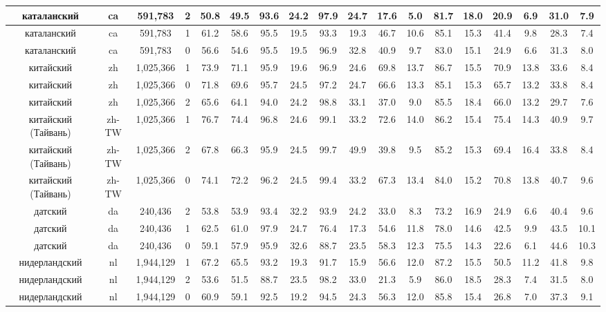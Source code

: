 \begin{table*}
{\begin{tabular}{|c|c|c|c||c|c|c|c|c|c|c|c|c|c|c|c|c|c|}
каталанский & ca & 591,783 & 2 & 50.8 & 49.5 & 93.6 & 24.2 & 97.9 & 24.7 & 17.6 & 5.0 & 81.7 & 18.0 & 20.9 & 6.9 & 31.0 & 7.9\\ \hline
каталанский & ca & 591,783 & 1 & 61.2 & 58.6 & 95.5 & 19.5 & 93.3 & 19.3 & 46.7 & 10.6 & 85.1 & 15.3 & 41.4 & 9.8 & 28.3 & 7.4\\ \hline
каталанский & ca & 591,783 & 0 & 56.6 & 54.6 & 95.5 & 19.5 & 96.9 & 32.8 & 40.9 & 9.7 & 83.0 & 15.1 & 24.9 & 6.6 & 31.3 & 8.0\\ \hline
китайский & zh & 1,025,366 & 1 & 73.9 & 71.1 & 95.9 & 19.6 & 96.9 & 24.6 & 69.8 & 13.7 & 86.7 & 15.5 & 70.9 & 13.8 & 33.6 & 8.4\\ \hline
китайский & zh & 1,025,366 & 0 & 71.8 & 69.6 & 95.7 & 24.5 & 97.2 & 24.7 & 66.6 & 13.3 & 85.1 & 15.3 & 65.7 & 13.2 & 33.8 & 8.4\\ \hline
китайский & zh & 1,025,366 & 2 & 65.6 & 64.1 & 94.0 & 24.2 & 98.8 & 33.1 & 37.0 & 9.0 & 85.5 & 18.4 & 66.0 & 13.2 & 29.7 & 7.6\\ \hline
китайский (Тайвань) & zh-TW & 1,025,366 & 1 & 76.7 & 74.4 & 96.8 & 24.6 & 99.1 & 33.2 & 72.6 & 14.0 & 86.2 & 15.4 & 75.4 & 14.3 & 40.9 & 9.7\\ \hline
китайский (Тайвань) & zh-TW & 1,025,366 & 2 & 67.8 & 66.3 & 95.9 & 24.5 & 99.7 & 49.9 & 39.8 & 9.5 & 85.2 & 15.3 & 69.4 & 16.4 & 33.8 & 8.4\\ \hline
китайский (Тайвань) & zh-TW & 1,025,366 & 0 & 74.1 & 72.2 & 96.2 & 24.5 & 99.4 & 33.2 & 67.3 & 13.4 & 84.0 & 15.2 & 70.8 & 13.8 & 40.7 & 9.6\\ \hline
датский & da & 240,436 & 2 & 53.8 & 53.9 & 93.4 & 32.2 & 93.9 & 24.2 & 33.0 & 8.3 & 73.2 & 16.9 & 24.9 & 6.6 & 40.4 & 9.6\\ \hline
датский & da & 240,436 & 1 & 62.5 & 61.0 & 97.9 & 24.7 & 76.4 & 17.3 & 54.6 & 11.8 & 78.0 & 14.6 & 42.5 & 9.9 & 43.5 & 10.1\\ \hline
датский & da & 240,436 & 0 & 59.1 & 57.9 & 95.9 & 32.6 & 88.7 & 23.5 & 58.3 & 12.3 & 75.5 & 14.3 & 22.6 & 6.1 & 44.6 & 10.3\\ \hline
нидерландский & nl & 1,944,129 & 1 & 67.2 & 65.5 & 93.2 & 19.3 & 91.7 & 15.9 & 56.6 & 12.0 & 87.2 & 15.5 & 50.5 & 11.2 & 41.8 & 9.8\\ \hline
нидерландский & nl & 1,944,129 & 2 & 53.6 & 51.5 & 88.7 & 23.5 & 98.2 & 33.0 & 21.3 & 5.9 & 86.0 & 18.5 & 28.3 & 7.4 & 31.5 & 8.0\\ \hline
нидерландский & nl & 1,944,129 & 0 & 60.9 & 59.1 & 92.5 & 19.2 & 94.5 & 24.3 & 56.3 & 12.0 & 85.8 & 15.4 & 26.8 & 7.0 & 37.3 & 9.1\\ \hline

\end{tabular}}
\end{table*}
